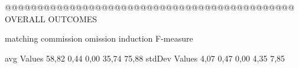 @@@@@@@@@@@@@@@@@@@@@@@@@@@@@@@@@@@@@@@@@@@@@ OVERALL OUTCOMES

               matching commission   omission  induction  F-measure
               
avg Values      58,82       0,44       0,00      35,74     75,88        
stdDev Values    4,07       0,47       0,00       4,35      7,85        